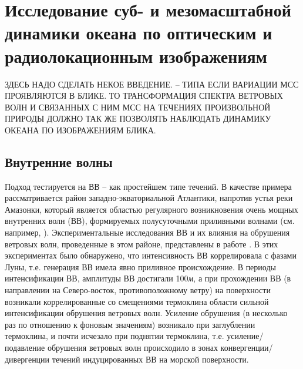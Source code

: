 \chapter{Исследование суб- и мезомасштабной динамики океана по оптическим и радиолокационным изображениям} \label{chap:3}

ЗДЕСЬ НАДО СДЕЛАТЬ НЕКОЕ ВВЕДЕНИЕ. -- ТИПА ЕСЛИ ВАРИАЦИИ МСС ПРОЯВЛЯЮТСЯ В БЛИКЕ. ТО ТРАНСФОРМАЦИЯ СПЕКТРА ВЕТРОВЫХ ВОЛН И СВЯЗАННЫХ С НИМ МСС НА ТЕЧЕНИЯХ ПРОИЗВОЛЬНОЙ ПРИРОДЫ ДОЛЖНО ТАК ЖЕ ПОЗВОЛЯТЬ НАБЛЮДАТЬ ДИНАМИКУ ОКЕАНА ПО ИЗОБРАЖЕНИЯМ БЛИКА. 













\section{Внутренние волны} \label{sec:3.1}


Подход тестируется на ВВ -- как простейшем типе течений. В качестве примера рассматривается район западно-экваториальной Атлантики, напротив устья реки Амазонки, который является областью регулярного возникновения очень мощных внутренних волн (ВВ), формируемых полусуточными приливными волнами (см. например, \citep{Ivanov1993}). Экспериментальные исследования ВВ и их влияния на обрушения ветровых волн, проведенные в этом районе, представлены в работе \citep{1986}. В этих экспериментах было обнаружено, что интенсивность ВВ коррелировала с фазами Луны, т.е. генерация ВВ имела явно приливное происхождение. В периоды интенсификации ВВ, амплитуды ВВ достигали 100\textit{м}, а при прохождении ВВ (в направлении на Северо-восток, противоположному ветру) на поверхности возникали коррелированные со смещениями термоклина области сильной интенсификации обрушения ветровых волн. Усиление обрушения (в несколько раз по отношению к фоновым значениям) возникало при заглублении термоклина, и почти исчезало при поднятии термоклина, т.е. усиление/подавление обрушения ветровых волн происходило в зонах конвергенции/дивергенции течений индуцированных ВВ на морской поверхности. 

